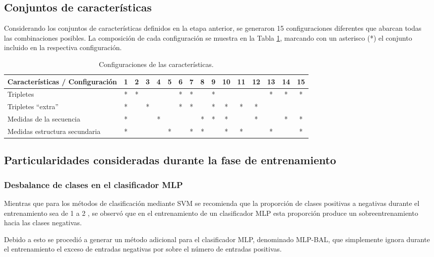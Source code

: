 \documentclass[12pt,bibliography=oldstyle,DIV=12,parskip=half-,titlepage]{scrartcl}
\begin{document}
\subsection{Conjuntos de características}
Considerando los conjuntos de características definidos en la etapa
anterior, se generaron 15 configuraciones diferentes que abarcan todas
las combinaciones posibles. La composición de cada configuración se
muestra en la Tabla \ref{featsets}, marcando con un asterisco (*) el
conjunto incluido en la respectiva configuración.
%
\begin{table}[H]
  \caption{Configuraciones de las características.}
  \center%
  \begin{tabular}{lccccccccccccccc}\toprule
Características / Configuración & 1& 2& 3& 4& 5& 6& 7& 8& 9&10&11&12&13&14&15\\
\midrule
Tripletes                       & *& *&  &  &  & *& *&  & *&  &  &  & *& *& *\\
Tripletes ``extra''             & *&  & *&  &  & *& *&  & *& *& *& *&  &  &  \\
Medidas de la secuencia         & *&  &  & *&  &  &  & *& *& *&  & *&  & *& *\\
Medidas estructura secundaria   & *&  &  &  & *&  & *& *&  & *& *&  & *&  & *\\
\bottomrule
  \end{tabular}
  \label{featsets}
\end{table}
%
\subsection{Particularidades consideradas durante la fase de entrenamiento}
\subsubsection{Desbalance de clases en el clasificador MLP}
Mientras que para los métodos de clasificación mediante SVM se
recomienda que la proporción de clases positivas a negativas durante
el entrenamiento sea de 1 a 2 \cite{ng}, se observó que en el
entrenamiento de un clasificador MLP esta proporción produce un
sobreentrenamiento hacia las clases negativas.

Debido a esto se procedió a generar un método adicional para el
clasificador MLP, denominado MLP-BAL, que simplemente ignora durante
el entrenamiento el exceso de entradas negativas por sobre el número
de entradas positivas.
%
\end{document}
